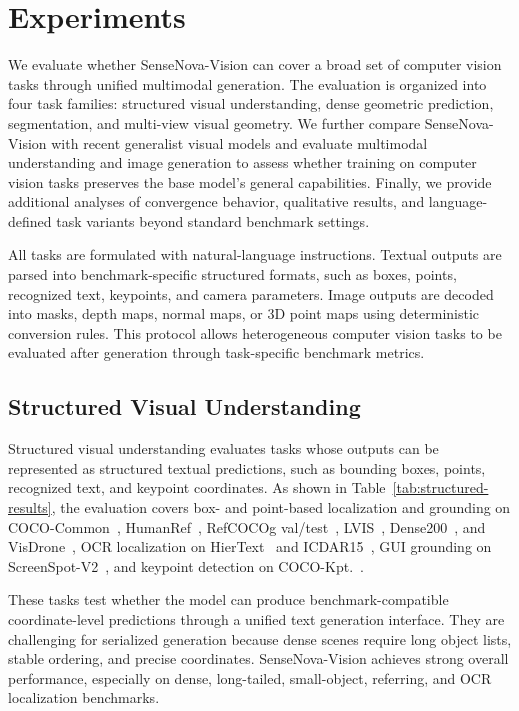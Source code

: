 \section{Experiments}
\label{sec:experiments}

We evaluate whether SenseNova-Vision can cover a broad set of computer vision tasks through unified multimodal generation.
The evaluation is organized into four task families: structured visual understanding, dense geometric prediction, segmentation, and multi-view visual geometry.
We further compare SenseNova-Vision with recent generalist visual models and evaluate multimodal understanding and image generation to assess whether training on computer vision tasks preserves the base model's general capabilities.
Finally, we provide additional analyses of convergence behavior, qualitative results, and language-defined task variants beyond standard benchmark settings.

All tasks are formulated with natural-language instructions.
Textual outputs are parsed into benchmark-specific structured formats, such as boxes, points, recognized text, keypoints, and camera parameters.
Image outputs are decoded into masks, depth maps, normal maps, or 3D point maps using deterministic conversion rules.
This protocol allows heterogeneous computer vision tasks to be evaluated after generation through task-specific benchmark metrics.

\subsection{Structured Visual Understanding}

Structured visual understanding evaluates tasks whose outputs can be represented as structured textual predictions, such as bounding boxes, points, recognized text, and keypoint coordinates.
As shown in Table~\ref{tab:structured-results}, the evaluation covers box- and point-based localization and grounding on COCO-Common~\cite{lin2014microsoft}, HumanRef~\cite{zhang2024humanref}, RefCOCOg val/test~\cite{yu2016modeling,kazemzadeh-etal-2014-referitgame}, LVIS~\cite{gupta2019lvis}, Dense200~\cite{rexomni}, and VisDrone~\cite{du2019visdrone}, OCR localization on HierText~\cite{long2022towards,long2023icdar} and ICDAR15~\cite{ICDAR2015}, GUI grounding on ScreenSpot-V2~\cite{wu2024atlas}, and keypoint detection on COCO-Kpt.~\cite{lin2014microsoft}.

These tasks test whether the model can produce benchmark-compatible coordinate-level predictions through a unified text generation interface.
They are challenging for serialized generation because dense scenes require long object lists, stable ordering, and precise coordinates.
SenseNova-Vision achieves strong overall performance, especially on dense, long-tailed, small-object, referring, and OCR localization benchmarks.

